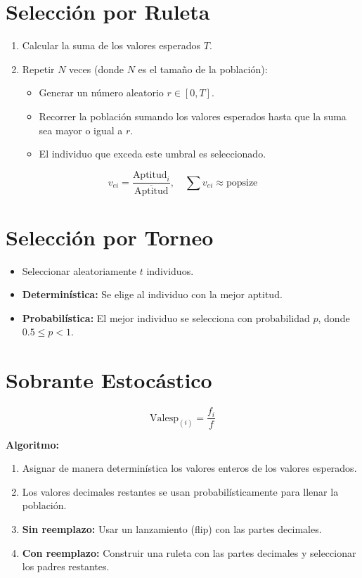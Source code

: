 \documentclass[11pt, letterpaper]{article}
\begin{document}
\section*{Selección por Ruleta}

\begin{enumerate}
	\item Calcular la suma de los valores esperados \( T \).
	\item Repetir \( N \) veces (donde \( N \) es el tamaño de la población):
	\begin{itemize}
		\item Generar un número aleatorio \( r \in [0, T] \).
		\item Recorrer la población sumando los valores esperados hasta que la suma sea mayor o igual a \( r \).
		\item El individuo que exceda este umbral es seleccionado.
	\end{itemize}
\end{enumerate}

\[
v_{ei} = \dfrac{\text{Aptitud}_i}{\overline{\text{Aptitud}}}, \quad \sum v_{ei} \approx \text{popsize}
\]

\section*{Selección por Torneo}

\begin{itemize}
	\item Seleccionar aleatoriamente \( t \) individuos.
	\item \textbf{Determinística:} Se elige al individuo con la mejor aptitud.
	\item \textbf{Probabilística:} El mejor individuo se selecciona con probabilidad \( p \), donde \( 0.5 \leq p < 1 \).
\end{itemize}

\section*{Sobrante Estocástico}

\[
\text{Valesp}_{(i)} = \dfrac{f_i}{f}
\]

\textbf{Algoritmo:}
\begin{enumerate}
	\item Asignar de manera determinística los valores enteros de los valores esperados.
	\item Los valores decimales restantes se usan probabilísticamente para llenar la población.
	\item \textbf{Sin reemplazo:} Usar un lanzamiento (flip) con las partes decimales.
	\item \textbf{Con reemplazo:} Construir una ruleta con las partes decimales y seleccionar los padres restantes.
\end{enumerate}
\end{document}
